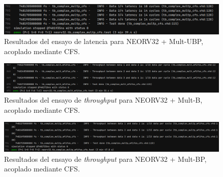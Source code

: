 \begin{figure}[H]
    \centering
    \includegraphics[width=14cm]{Figuras/result/lat14.png}
    \caption{Resultados del ensayo de latencia para NEORV32 + Mult-UBP, acoplado mediante CFS.}
    \label{fig:lat14}
\end{figure}

\begin{figure}[H]
    \centering
    \includegraphics[width=14cm]{Figuras/result/thr8.png}
    \caption{Resultados del ensayo de \textit{throughput} para NEORV32 + Mult-B, acoplado mediante CFS.}
    \label{fig:thr8}
\end{figure}

\begin{figure}[H]
    \centering
    \includegraphics[width=14cm]{Figuras/result/thr9.png}
    \caption{Resultados del ensayo de \textit{throughput} para NEORV32 + Mult-BP, acoplado mediante CFS.}
    \label{fig:thr9}
\end{figure}
